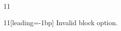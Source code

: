 \documentclass[paper=A4]{ropas-poster}
\begin{document}
\begin{postergrid}{1}{1}
\begin{posterblock}{1}{1}[leading=-1bp]
Invalid block option.
\end{posterblock}
\end{postergrid}
\end{document}
